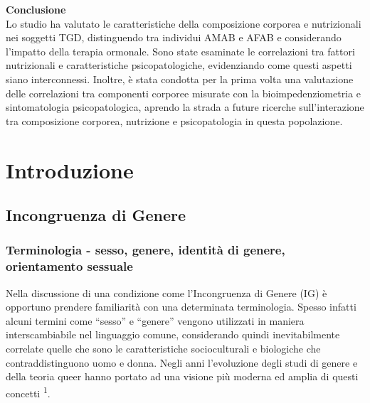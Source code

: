 \documentclass[12pt]{article}
\makeatletter
\newcommand{\cslcitation}[2]
 {\protect\hyper@linkstart{cite}{citeproc_bib_item_#1}#2\hyper@linkend}
\makeatother
\begin{document}
\textbf{Conclusione} \\
Lo studio ha valutato le caratteristiche della composizione corporea e nutrizionali nei soggetti TGD, distinguendo tra individui AMAB e AFAB e considerando l'impatto della terapia ormonale. Sono state esaminate le correlazioni tra fattori nutrizionali e caratteristiche psicopatologiche, evidenziando come questi aspetti siano interconnessi. Inoltre, è stata condotta per la prima volta una valutazione delle correlazioni tra componenti corporee misurate con la bioimpedenziometria e sintomatologia psicopatologica, aprendo la strada a future ricerche sull'interazione tra composizione corporea, nutrizione e psicopatologia in questa popolazione.
\section{Introduzione}
\label{sec:orgf83c0c2}
\subsection{Incongruenza di Genere}
\label{sec:org08e6199}
\subsubsection{Terminologia - sesso, genere, identità di genere, orientamento sessuale}
\label{sec:orgfbab63a}
Nella discussione di una condizione come l'Incongruenza di Genere (IG) è opportuno prendere familiarità con una determinata terminologia. Spesso infatti alcuni termini come ``sesso'' e ``genere'' vengono utilizzati in maniera interscambiabile nel linguaggio comune, considerando quindi inevitabilmente
correlate quelle che sono le caratteristiche socioculturali e biologiche che contraddistinguono uomo e donna.
Negli anni l'evoluzione degli studi di genere e della teoria queer hanno portato ad una visione più moderna ed amplia di questi concetti \textsuperscript{\cslcitation{1}{1}}.
\end{document}
